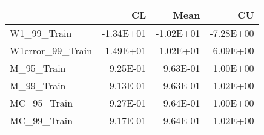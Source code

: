 \begin{tabular}{lrrr}
\toprule
{} &        CL &      Mean &        CU \\
\midrule
W1\_99\_Train      & -1.34E+01 & -1.02E+01 & -7.28E+00 \\
W1error\_99\_Train & -1.49E+01 & -1.02E+01 & -6.09E+00 \\
M\_95\_Train       &  9.25E-01 &  9.63E-01 &  1.00E+00 \\
M\_99\_Train       &  9.13E-01 &  9.63E-01 &  1.02E+00 \\
MC\_95\_Train      &  9.27E-01 &  9.64E-01 &  1.00E+00 \\
MC\_99\_Train      &  9.17E-01 &  9.64E-01 &  1.02E+00 \\
\bottomrule
\end{tabular}
